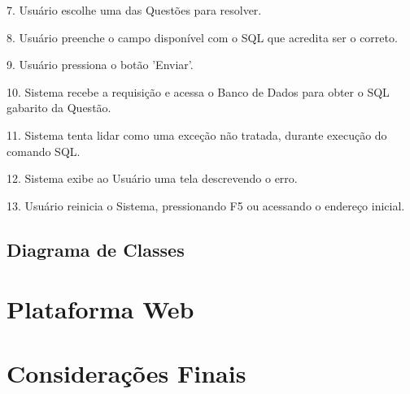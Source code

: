 \documentclass[graduacao,brazil]{ThesisPUC}
\begin{document}
7. Usu\'{a}rio escolhe uma das Quest\~{o}es para resolver.

8. Usu\'{a}rio preenche o campo dispon\'{i}vel com o SQL que acredita ser o correto.

9. Usu\'{a}rio pressiona o bot\~{a}o 'Enviar'.

10. Sistema recebe a requisi\c{c}\~{a}o e acessa o Banco de Dados para obter o SQL gabarito da Quest\~{a}o.

11. Sistema tenta lidar como uma exce\c{c}\~{a}o n\~{a}o tratada, durante execu\c{c}\~{a}o do comando SQL.

12. Sistema exibe ao Usu\'{a}rio uma tela descrevendo o erro.

13. Usu\'{a}rio reinicia o Sistema, pressionando F5 ou acessando o endere\c{c}o inicial.

\section{Diagrama de Classes}

\chapter{Plataforma Web}

\chapter{Considera\c{c}\~{o}es Finais}

\arial


\normalfont
\end{document}
